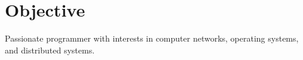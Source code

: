 \documentclass[../main.tex]{subfiles}
\begin{document}
\section{Objective}
\begin{category}
    Passionate programmer with interests in computer networks, operating systems, and distributed systems. 
\end{category}
\end{document}
